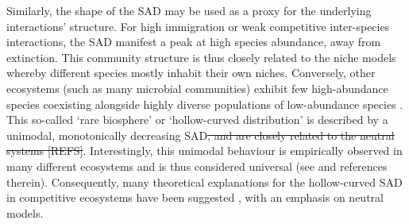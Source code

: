 \documentclass[9pt,twocolumn,twoside,lineno]{pnas-new}
\begin{document}

Similarly, the shape of the SAD may be used as a proxy for the underlying interactions' structure. 
For high immigration or weak competitive inter-species interactions, the SAD manifest a peak at high species abundance, away from extinction.
This community structure is thus closely related to the niche models whereby different species mostly inhabit their own niches.
Conversely, other ecosystems (such as many microbial communities) exhibit few high-abundance species coexisting alongside highly diverse populations of low-abundance species \cite{lynch2015ecology}.
This so-called `rare biosphere' or `hollow-curved distribution' is described by a unimodal, monotonically decreasing SAD\st{, and are closely related to the neutral systems [REFS]}.
Interestingly, this unimodal behaviour is empirically observed in many different ecosystems and is thus considered universal (see \cite{leidinger2017biodiversity} and references therein).
Consequently, many theoretical explanations for the hollow-curved SAD in competitive ecosystems have been suggested \cite{mcgill2007species,magurran2013measuring}, with an emphasis on neutral models.

\end{document}
